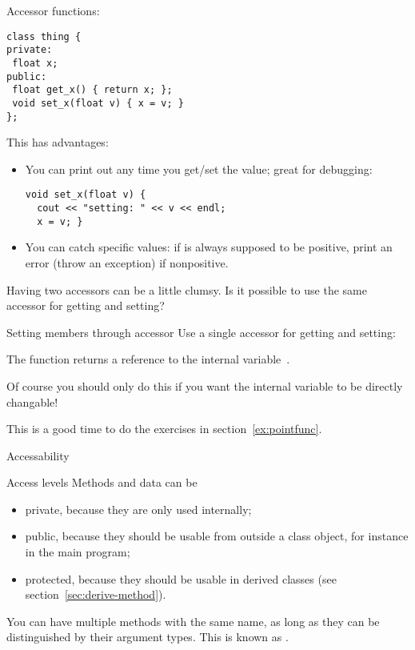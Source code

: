 Accessor functions:
\begin{verbatim}
class thing {
private:
 float x;
public:
 float get_x() { return x; };
 void set_x(float v) { x = v; }
};
\end{verbatim}
This has advantages:
\begin{itemize}
\item You can print out any time you get/set the value; great for
  debugging:
\begin{verbatim}
void set_x(float v) {
  cout << "setting: " << v << endl;
  x = v; }
\end{verbatim}
\item You can catch specific values: if  is always supposed to be
  positive, print an error (throw an exception) if nonpositive.
\end{itemize}

Having two accessors can be a little clumsy. Is it possible to use the
same accessor for getting and setting?

\begin{block}{Setting members through accessor}
  \label{sl:setmember}
  Use a single accessor for getting and setting:

  The function  returns a reference to the internal
  variable~.
\end{block}

Of course you should only do this if you want the internal variable to
be directly changable!

This is a good time to do the exercises in section~\ref{ex:pointfunc}.

 {Accessability}

\begin{slide}{Access levels}
  \label{sl:private-etc}
  Methods and data can be 
  \begin{itemize}
  \item private, because they are only used internally;
  \item public, because they should be usable from outside a class
    object, for instance in the main program;
  \item protected, because they should be usable in derived classes (see
    section~\ref{sec:derive-method}).
  \end{itemize}
\end{slide}

You can have multiple methods with the same name, as long as they can
be distinguished by their argument types. This is known as .


